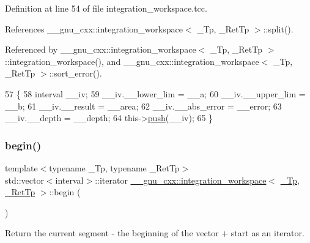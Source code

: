 Definition at line 54 of file integration\+\_\+workspace.\+tcc.



References \+\_\+\+\_\+gnu\+\_\+cxx\+::integration\+\_\+workspace$<$ \+\_\+\+Tp, \+\_\+\+Ret\+Tp $>$\+::split().



Referenced by \+\_\+\+\_\+gnu\+\_\+cxx\+::integration\+\_\+workspace$<$ \+\_\+\+Tp, \+\_\+\+Ret\+Tp $>$\+::integration\+\_\+workspace(), and \+\_\+\+\_\+gnu\+\_\+cxx\+::integration\+\_\+workspace$<$ \+\_\+\+Tp, \+\_\+\+Ret\+Tp $>$\+::sort\+\_\+error().


\begin{DoxyCode}
57     \{
58       interval \_\_iv;
59       \_\_iv.\_\_lower\_lim = \_\_a;
60       \_\_iv.\_\_upper\_lim = \_\_b;
61       \_\_iv.\_\_result = \_\_area;
62       \_\_iv.\_\_abs\_error = \_\_error;
63       \_\_iv.\_\_depth = \_\_depth;
64       this->\hyperlink{class____gnu__cxx_1_1integration__workspace_a3d4ccc05a0cc0a2cda9cf2a5243b804d}{push}(\_\_iv);
65     \}
\end{DoxyCode}
\mbox{\label{class____gnu__cxx_1_1integration__workspace_a9ecef94e75c1bc84e59300fe6504eed9}} 
\subsubsection{\texorpdfstring{begin()}{begin()}}
{\footnotesize\ttfamily template$<$typename \+\_\+\+Tp, typename \+\_\+\+Ret\+Tp$>$ \\
std\+::vector$<$interval$>$\+::iterator \hyperlink{class____gnu__cxx_1_1integration__workspace}{\+\_\+\+\_\+gnu\+\_\+cxx\+::integration\+\_\+workspace}$<$ \hyperlink{namespace____gnu__cxx_a3b19a9c800ca194374ef9172290f7d79}{\+\_\+\+Tp}, \hyperlink{namespace____gnu__cxx_a886e03ece3d53ff7fa6c098a40f93fa5}{\+\_\+\+Ret\+Tp} $>$\+::begin (\begin{DoxyParamCaption}{ }\end{DoxyParamCaption})\hspace{0.3cm}{\ttfamily [inline]}}

Return the current segment -\/ the beginning of the vector + start as an iterator. 

